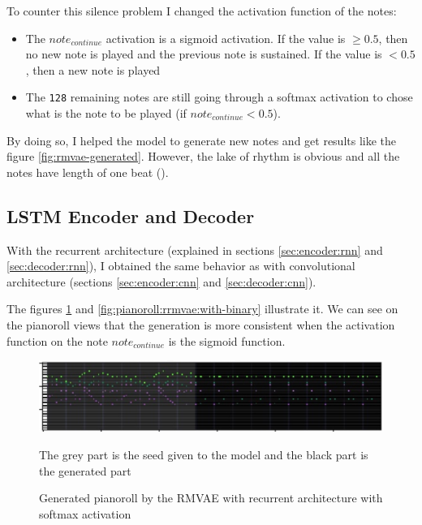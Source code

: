 \documentclass[12pt]{report}
\begin{document}
To counter this silence problem I changed the activation function of the notes:
\begin{itemize}
    \item The $note_{continue}$ activation is a sigmoid activation.
    If the value is $\geq 0.5$, then no new note is played and the previous note is sustained.
    If the value is $< 0.5$, then a new note is played
    \item The \texttt{128} remaining notes are still going through a softmax activation to chose what is the note to be played (if $note_{continue} <0.5$).
\end{itemize}

By doing so, I helped the model to generate new notes and get results like the figure \ref{fig:rmvae-generated}.
However, the lake of rhythm is obvious and all the notes have length of one beat (\musQuarter).


\subsection{LSTM Encoder and Decoder}

With the recurrent architecture (explained in sections \ref{sec:encoder:rnn} and \ref{sec:decoder:rnn}), I obtained the same behavior as with convolutional architecture (sections \ref{sec:encoder:cnn} and \ref{sec:decoder:cnn}).

The figures \ref{fig:pianoroll:rrmvae:no-binary} and \ref{fig:pianoroll:rrmvae:with-binary} illustrate it.
We can see on the pianoroll views that the generation is more consistent when the activation function on the note $note_{continue}$ is the sigmoid function.

\begin{figure}[htbp]
    \centering
    \includegraphics[width=\textwidth]{images/generated_midis/RRMVAE/pianoroll-rrmvae-no-binary.jpg}
    \caption{Generated pianoroll by the RMVAE with recurrent architecture with softmax activation}
    The grey part is the seed given to the model and the black part is the generated part
    \label{fig:pianoroll:rrmvae:no-binary}
\end{figure}
\end{document}
